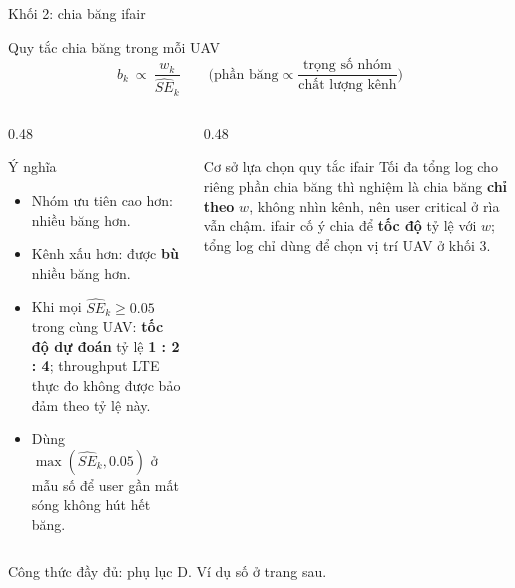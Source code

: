 \documentclass[aspectratio=169,10pt,t]{beamer}
\newcommand{\hl}[1]{\textcolor{MainBlue}{\textbf{#1}}}
\newcommand{\SE}{\widehat{SE}}
\begin{document}
\begin{frame}{Khối 2: chia băng ifair}
\begin{block}{Quy tắc chia băng trong mỗi UAV}
\vspace{-3mm}
\[
  b_k \ \propto\ \frac{w_k}{\SE_k}
  \qquad\text{(phần băng} \propto \frac{\text{trọng số nhóm}}{\text{chất lượng kênh}}\text{)}
\]
\end{block}
\begin{columns}[T,onlytextwidth]
\begin{column}{0.48\textwidth}
\vspace{0pt}
  \begin{block}{Ý nghĩa}
    \small
    \begin{itemize}
      \item Nhóm ưu tiên cao hơn: nhiều băng hơn.
      \item Kênh xấu hơn: được \hl{bù} nhiều băng hơn.
      \item Khi mọi $\SE_k \ge 0.05$ trong cùng UAV: \hl{tốc độ dự đoán} tỷ lệ \hl{1 : 2 : 4}; throughput LTE thực đo không được bảo đảm theo tỷ lệ này.
      \item Dùng $\max(\SE_k, 0.05)$ ở mẫu số để user gần mất sóng không hút hết băng.
    \end{itemize}
  \end{block}
\end{column}
\begin{column}{0.48\textwidth}
\vspace{0pt}
  \begin{block}{Cơ sở lựa chọn quy tắc ifair}
    \small
    Tối đa tổng log cho riêng phần chia băng thì nghiệm là chia băng \textbf{chỉ theo} $w$, không nhìn kênh,
    nên user critical ở rìa vẫn chậm.
    ifair cố ý chia để \hl{tốc độ} tỷ lệ với $w$; tổng log chỉ dùng để chọn vị trí UAV ở khối 3.
  \end{block}
\end{column}
\end{columns}
\vspace{1mm}
\scriptsize Công thức đầy đủ: phụ lục D. Ví dụ số ở trang sau.
\end{frame}
\end{document}
